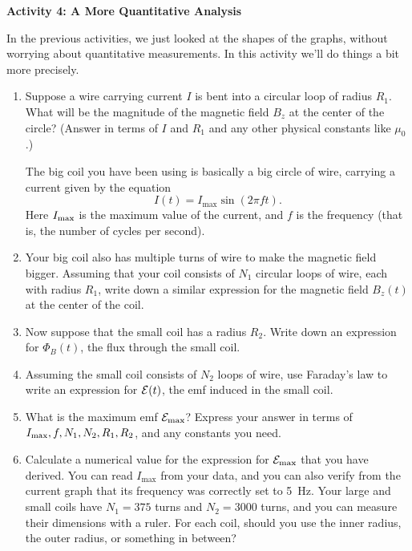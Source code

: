 \textbf{Activity 4: A More Quantitative Analysis}

In the previous activities, we just looked at the shapes of the graphs, without worrying
about quantitative measurements.  In this activity we'll do things a bit more precisely.

\begin{enumerate}[labparts]
\item Suppose a wire carrying current $I$ is bent into a circular loop of radius $R_1$.  What will be the magnitude of the magnetic field $B_z$ at the center of the circle? (Answer in terms of $I$ and $R_1$ and any other physical constants like $\mu_0$.)
\answerspace{1.2in}

The big coil you have been using is basically a big circle of wire, carrying a current given by the equation
$$
I(t)=I_\text{max}\sin(2\pi f t).
$$
Here $I_{\rm max}$ is the maximum value of the current, and
$f$ is the frequency (that is, the number of cycles per second).  

\item Your big coil also has multiple turns of wire to make the magnetic field bigger.
Assuming that your coil consists of $N_1$ circular loops of
wire, each with radius $R_1$, write down a similar expression for
the magnetic field $B_z(t)$ at the center of the coil.
\answerspace{0.8in}

\item Now suppose that the small coil has a radius $R_2$.  Write down an expression for $\Phi_B(t)$, the
flux through the small coil.
\answerspace{0.75in}

\item Assuming the small coil consists of $N_2$ loops of wire, use Faraday's law to write an expression 
for ${\cal E}(t)$, the emf induced in the small coil.
\answerspace{0.75in}

\item What is the maximum emf $\mathcal{E}_{\rm max}$?  Express your answer
in terms of  $I_{\rm max},f,N_1,N_2,R_1, R_2$, and any constants you need.
\answerspace{0.75in}

\item Calculate a numerical value for the expression for $\mathcal{E}_{\rm max}$ that you have derived. 
You can read $I_\text{max}$ from your data, and you can also verify from the current graph that its frequency was correctly set to 5~Hz.  Your large and small coils have $N_1=375$ turns and $N_2=3000$ turns, and you can measure their dimensions with a ruler.  For each coil, should you use the inner radius, the outer radius, or something in between?


\end{enumerate}

